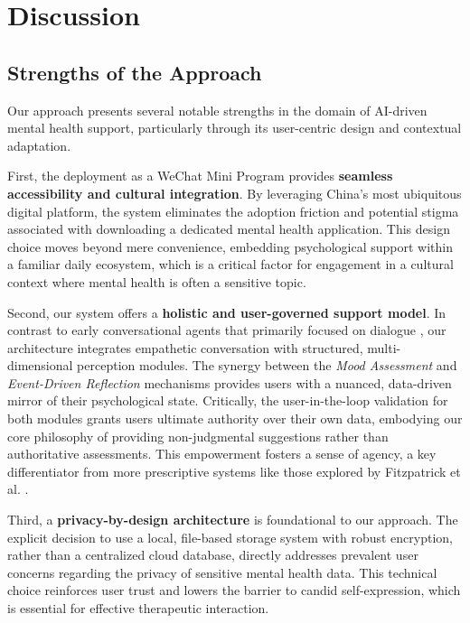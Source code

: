 \section{Discussion}
\label{sec:discussion}

\subsection{Strengths of the Approach}

Our approach presents several notable strengths in the domain of AI-driven mental health support, particularly through its user-centric design and contextual adaptation.

First, the deployment as a WeChat Mini Program provides \textbf{seamless accessibility and cultural integration}. By leveraging China's most ubiquitous digital platform, the system eliminates the adoption friction and potential stigma associated with downloading a dedicated mental health application. This design choice moves beyond mere convenience, embedding psychological support within a familiar daily ecosystem, which is a critical factor for engagement in a cultural context where mental health is often a sensitive topic.

Second, our system offers a \textbf{holistic and user-governed support model}. In contrast to early conversational agents that primarily focused on dialogue \cite{weizenbaum1966}, our architecture integrates empathetic conversation with structured, multi-dimensional perception modules. The synergy between the \textit{Mood Assessment} and \textit{Event-Driven Reflection} mechanisms provides users with a nuanced, data-driven mirror of their psychological state. Critically, the user-in-the-loop validation for both modules grants users ultimate authority over their own data, embodying our core philosophy of providing non-judgmental suggestions rather than authoritative assessments. This empowerment fosters a sense of agency, a key differentiator from more prescriptive systems like those explored by Fitzpatrick et al. \cite{fitzpatrick2017}.

Third, a \textbf{privacy-by-design architecture} is foundational to our approach. The explicit decision to use a local, file-based storage system with robust encryption, rather than a centralized cloud database, directly addresses prevalent user concerns regarding the privacy of sensitive mental health data. This technical choice reinforces user trust and lowers the barrier to candid self-expression, which is essential for effective therapeutic interaction.

